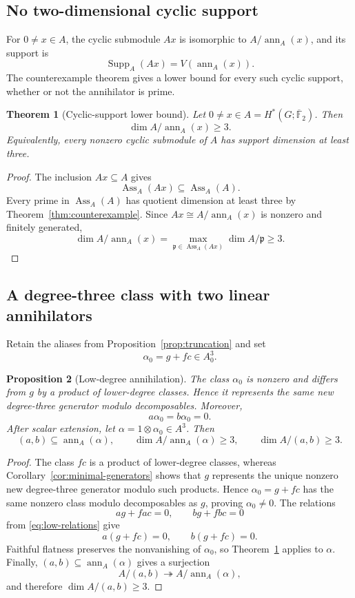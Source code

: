 \documentclass[11pt]{amsart}
\newtheorem{theorem}{Theorem}[section]
\newtheorem{proposition}[theorem]{Proposition}
\theoremstyle{definition}
\theoremstyle{remark}
\DeclareMathOperator{\Ass}{Ass}
\DeclareMathOperator{\ann}{ann}
\DeclareMathOperator{\Supp}{Supp}
\newcommand{\kbar}{\overline{\mathbb F}_{2}}
\begin{document}
\subsection{No two-dimensional cyclic support}

For $0\neq x\in A$, the cyclic submodule $Ax$ is isomorphic to $A/\ann_A(x)$, and its support is
\[
\Supp_A(Ax)=V(\ann_A(x)).
\]
The counterexample theorem gives a lower bound for every such cyclic support, whether or not the annihilator is prime.

\begin{theorem}[Cyclic-support lower bound]
\label{thm:cyclic-support}
Let $0\neq x\in A=H^*(G;\kbar)$.  Then
\[
\dim A/\ann_A(x)\geq3.
\]
Equivalently, every nonzero cyclic submodule of $A$ has support dimension at least three.
\end{theorem}

\begin{proof}
The inclusion $Ax\subseteq A$ gives
\[
\Ass_A(Ax)\subseteq\Ass_A(A).
\]
Every prime in $\Ass_A(A)$ has quotient dimension at least three by Theorem~\ref{thm:counterexample}.  Since $Ax\cong A/\ann_A(x)$ is nonzero and finitely generated,
\[
\dim A/\ann_A(x)
=\max_{\mathfrak p\in\Ass_A(Ax)}\dim A/\mathfrak p
\geq3.
\]
\end{proof}

\subsection{A degree-three class with two linear annihilators}

Retain the aliases from Proposition~\ref{prop:truncation} and set
\begin{equation}
\label{eq:alpha}
\alpha_0=g+fc\in A_0^3.
\end{equation}

\begin{proposition}[Low-degree annihilation]
\label{prop:alpha}
The class $\alpha_0$ is nonzero and differs from $g$ by a product of lower-degree classes.  Hence it represents the same new degree-three generator modulo decomposables.  Moreover,
\[
a\alpha_0=b\alpha_0=0.
\]
After scalar extension, let $\alpha=1\otimes\alpha_0\in A^3$.  Then
\[
(a,b)\subseteq\ann_A(\alpha),
\qquad
\dim A/\ann_A(\alpha)\geq3,
\qquad
\dim A/(a,b)\geq3.
\]
\end{proposition}

\begin{proof}
The class $fc$ is a product of lower-degree classes, whereas Corollary~\ref{cor:minimal-generators} shows that $g$ represents the unique nonzero new degree-three generator modulo such products.  Hence $\alpha_0=g+fc$ has the same nonzero class modulo decomposables as $g$, proving $\alpha_0\neq0$.  The relations
\[
ag+fac=0,
\qquad
bg+fbc=0
\]
from \eqref{eq:low-relations} give
\[
a(g+fc)=0,
\qquad
b(g+fc)=0.
\]
Faithful flatness preserves the nonvanishing of $\alpha_0$, so Theorem~\ref{thm:cyclic-support} applies to $\alpha$.  Finally, $(a,b)\subseteq\ann_A(\alpha)$ gives a surjection
\[
A/(a,b)\twoheadrightarrow A/\ann_A(\alpha),
\]
and therefore $\dim A/(a,b)\geq3$.
\end{proof}
\end{document}
